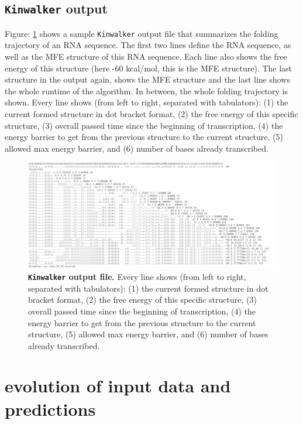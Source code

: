 \documentclass[ twoside,openright,titlepage,numbers=noenddot,headinclude,%
                footinclude=false, cleardoublepage=empty,abstractoff, %
                BCOR=5mm,paper=a4,fontsize=11pt,%
                ngerman,american,%
                ]{scrreprt}
\begin{document}
\subsection{\texttt{Kinwalker} output}


Figure: \ref{fig:kinwalker output} shows a sample \texttt{Kinwalker} output file that summarizes the folding trajectory of an RNA sequence.
The first two lines define the RNA sequence, as well as the MFE structure of this RNA sequence. Each line also shows the free energy of this structure (here -60 kcal/mol, this is the MFE structure).
The last structure in the output again, shows the MFE structure and the last line shows the whole runtime of the algorithm.
In between, the whole folding trajectory is shown.
Every line shows (from left to right, separated with tabulators):
(1) the current formed structure in dot bracket format, (2) the free energy
of this specific structure, (3) overall passed time since the beginning of
transcription, (4) the energy barrier to get from the previous structure to
the current structure, (5) allowed max energy barrier, and (6) number of bases already transcribed.

\begin{figure}[ht] 
\centering
\includegraphics[width=1\textwidth]{./pictures/KinwalkOutput.png}
\caption{{\bf \texttt{Kinwalker} output file.}
Every line shows (from left to right, separated with tabulators):
(1) the current formed structure in dot bracket format, (2) the free energy
of this specific structure, (3) overall passed time since the beginning of
transcription, (4) the energy barrier to get from the previous structure to
the current structure, (5) allowed max energy barrier, and (6) number of bases already transcribed.
}
\label{fig:kinwalker output}
\end{figure}
\FloatBarrier


\section{evolution of input data and predictions} \label{section:scores}
\end{document}
